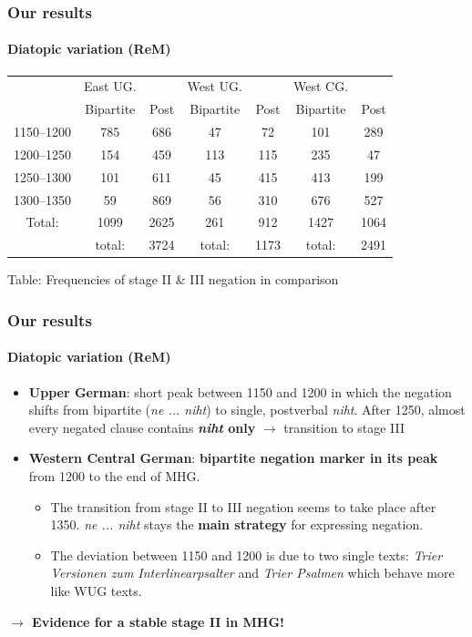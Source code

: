 \documentclass[xcolor=table, compress, %
handout
]{beamer}
\begin{document}
\begin{frame}
\frametitle{Our results}
\framesubtitle{Diatopic variation (ReM)}

\begin{small}
\begin{center}
\begin{tabular}{c c c | c c | c c}
\hline\hline
 & East UG. &  & West UG. & & West CG. & \\
 & Bipartite & Post & Bipartite & Post & Bipartite & Post\\
\hline
\alert{1150–1200} & \alert{785} & \alert{686} & \alert{47} & \alert{72} & 101 & 289 \\
1200–1250 & 154 & 459 & \alert{113} & \alert{115} & \alert{235} & \alert{47}\\
1250–1300 & 101 & 611 & 45 & 415 & \alert{413} & \alert{199}\\
1300–1350 & 59 & 869 & 56 & 310 & \alert{676} & \alert{527}\\
\hline
Total: & 1099 & 2625 & 261 & 912 & 1427 & 1064\\
 & total: & 3724 & total: & 1173 & total: & 2491\\
\hline\hline
\end{tabular}
\end{center}
\end{small}
\begin{center}
Table: Frequencies of stage II \& III negation in comparison
\end{center}

\end{frame}

\begin{frame}
\frametitle{Our results}
\framesubtitle{Diatopic variation (ReM)}

    \begin{itemize}
            \item \textbf{Upper German}: short peak between 1150 and 1200 in which the negation shifts from bipartite (\textit{ne ... niht}) to single, postverbal \textit{niht}. After 1250, almost every negated clause contains \textbf{\textit{niht} only} $\rightarrow$ transition to stage III
            \item \textbf{Western Central German}: \textbf{bipartite negation marker in its peak} from 1200 to the end of MHG. 
            \begin{itemize}
                \item The transition from stage II to III negation seems to take place after 1350. \textit{ne ... niht} stays the \textbf{main strategy} for expressing negation.
                \item The deviation between 1150 and 1200 is due to two single texts: \textit{Trier Versionen zum Interlinearpsalter} and \textit{Trier Psalmen} which behave more like WUG texts.
                \end{itemize}
    \end{itemize}
    
\centering    \textbf{ $\rightarrow$ Evidence for a stable stage II in MHG!}

\end{frame}
\end{document}
